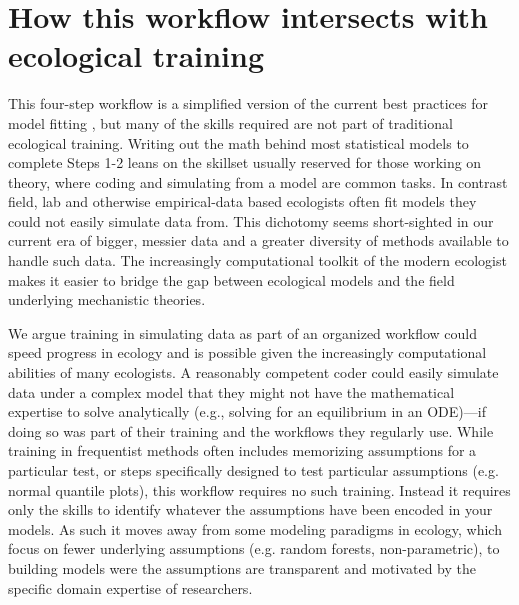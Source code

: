 \documentclass[11pt]{article}
\newcommand{\R}[1]{\label{}\linelabel{#1}}
\begin{document}
\section*{How this workflow intersects with ecological training} %

This four-step workflow is a simplified version of the current best practices for model fitting  \citep{betanworkflow,vandeschoot2021}, but many of the skills required are not part of traditional ecological training. Writing out the math behind most statistical models to complete Steps 1-2 leans on the skillset usually reserved for those working on theory, where coding and simulating from a model are common tasks. In contrast field, lab and otherwise empirical-data based ecologists often fit models they could not easily simulate data from. This dichotomy seems short-sighted in our current era of bigger, messier data and a greater diversity of methods available to handle such data. The increasingly computational toolkit of the modern ecologist makes it easier to bridge the gap between ecological models and the field underlying mechanistic theories.\R{huh}

We argue training in simulating data as part of an organized workflow could speed progress in ecology and is possible given the increasingly computational abilities of many ecologists. A reasonably competent coder could easily simulate data under a complex model that they might not have the mathematical expertise to solve analytically (e.g., solving for an equilibrium in an ODE)\R{ode}---if doing so was part of their training and the workflows they regularly use. While training in frequentist methods often includes memorizing assumptions for a particular test, or steps specifically designed to test particular assumptions (e.g. normal quantile plots), this workflow requires no such training. Instead it requires only the skills to identify whatever the assumptions have been encoded in your models. As such it moves away from some modeling paradigms in ecology, which focus on fewer underlying assumptions (e.g. random forests, non-parametric), to building models were the assumptions are transparent and motivated by the specific domain expertise of researchers. %
\end{document}
